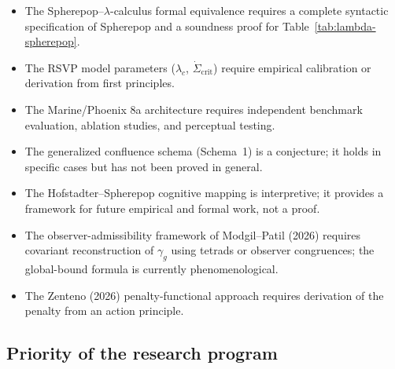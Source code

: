 \documentclass[12pt, a4paper]{article}
\theoremstyle{plain}
\theoremstyle{definition}
\theoremstyle{remark}
\begin{document}
\begin{itemize}
  \item The Spherepop--$\lambda$-calculus formal equivalence requires a
        complete syntactic specification of Spherepop and a soundness
        proof for Table~\ref{tab:lambda-spherepop}.
  \item The RSVP model parameters ($\lambda_c$, $\dot{\Sigma}_{\mathrm{crit}}$)
        require empirical calibration or derivation from first principles.
  \item The Marine/Phoenix 8a architecture requires independent benchmark
        evaluation, ablation studies, and perceptual testing.
  \item The generalized confluence schema (Schema~1) is a conjecture;
        it holds in specific cases but has not been proved in general.
  \item The Hofstadter--Spherepop cognitive mapping is interpretive;
        it provides a framework for future empirical and formal work,
        not a proof.
  \item The observer-admissibility framework of Modgil--Patil (2026)
        requires covariant reconstruction of $\gamma_g$ using tetrads
        or observer congruences; the global-bound formula is
        currently phenomenological.
  \item The Zenteno (2026) penalty-functional approach requires
        derivation of the penalty from an action principle.
\end{itemize}

\subsection{Priority of the research program}
\end{document}
